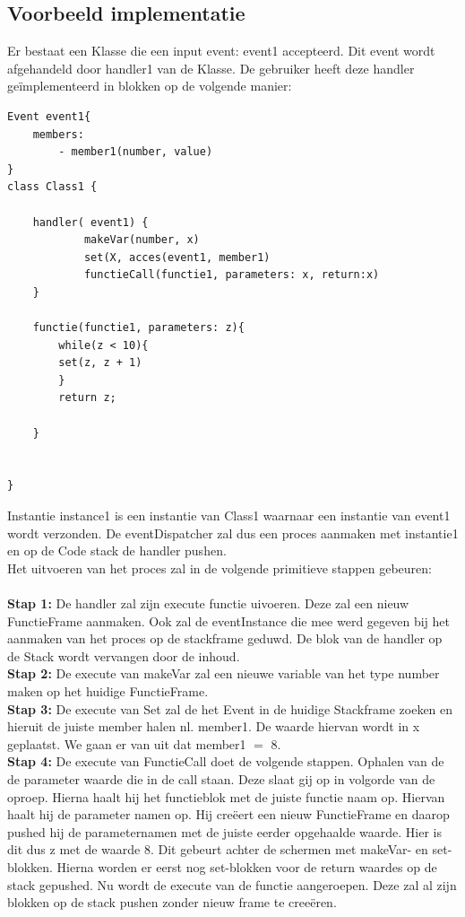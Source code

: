 \documentclass[]{article}
\begin{document}
\subsection{Voorbeeld implementatie}
\label{voorbeeldvm}
Er bestaat een Klasse die een input event: event1 accepteerd. Dit event wordt afgehandeld door handler1 van de Klasse. De gebruiker heeft deze handler ge\"{i}mplementeerd in blokken op de volgende manier:
\lstset{language=Java}
\begin{lstlisting}
Event event1{
	members:
		- member1(number, value)
}
class Class1 {

	handler( event1) {
    		makeVar(number, x)
    		set(X, acces(event1, member1)
    		functieCall(functie1, parameters: x, return:x)
	}
	
	functie(functie1, parameters: z){
		while(z < 10){
		set(z, z + 1)
		}
		return z;
			
	}
	
	
}
\end{lstlisting}
Instantie instance1 is een instantie van Class1 waarnaar een instantie van event1 wordt verzonden. De eventDispatcher zal dus een proces aanmaken met instantie1 en op de Code stack de handler pushen.\\
Het uitvoeren van het proces zal in de volgende primitieve stappen gebeuren:\\\\
\textbf{Stap 1:} De handler zal zijn execute functie uivoeren. Deze zal een nieuw FunctieFrame aanmaken. Ook zal de eventInstance die mee werd gegeven bij het aanmaken van het proces op de stackframe geduwd. De blok van de handler op de Stack wordt vervangen door de inhoud.\\
\textbf{Stap 2:} De execute van makeVar zal een nieuwe variable van het type number maken op het huidige FunctieFrame.\\
\textbf{Stap 3:} De execute van Set zal de het Event in de huidige Stackframe zoeken en hieruit de juiste member halen nl. member1. De waarde hiervan wordt in x geplaatst. We gaan er van uit dat member1 $=$ 8.\\
\textbf{Stap 4:} De execute van FunctieCall doet de volgende stappen. Ophalen van de de parameter waarde die in de call staan. Deze slaat gij op in volgorde van de oproep. Hierna haalt hij het functieblok met de juiste functie naam op. Hiervan haalt hij de parameter namen op. Hij cre\"{e}ert een nieuw FunctieFrame en daarop pushed hij de parameternamen met de juiste eerder opgehaalde waarde. Hier is dit dus z met de waarde 8. Dit gebeurt achter de schermen met makeVar- en set-blokken. Hierna worden er eerst nog set-blokken voor de return waardes op de stack gepushed. Nu wordt de execute van de functie aangeroepen. Deze zal al zijn blokken op de stack pushen zonder nieuw frame te cree\"{e}ren.\\
\end{document}
